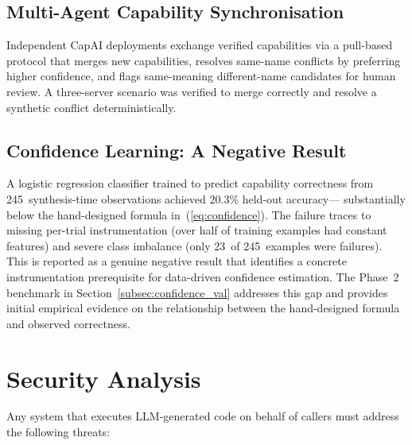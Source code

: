 \documentclass[conference]{IEEEtran}
\begin{document}
\subsection{Multi-Agent Capability Synchronisation}

Independent CapAI deployments exchange verified capabilities via a
pull-based protocol that merges new capabilities, resolves same-name
conflicts by preferring higher confidence, and flags same-meaning
different-name candidates for human review.
A three-server scenario was verified to merge correctly and resolve a
synthetic conflict deterministically.

\subsection{Confidence Learning: A Negative Result}

A logistic regression classifier trained to predict capability correctness
from 245~synthesis-time observations achieved 20.3\% held-out accuracy---
substantially below the hand-designed formula in~(\ref{eq:confidence}).
The failure traces to missing per-trial instrumentation (over half of
training examples had constant features) and severe class imbalance
(only 23~of 245~examples were failures).
This is reported as a genuine negative result that identifies a concrete
instrumentation prerequisite for data-driven confidence estimation.
The Phase~2 benchmark in Section~\ref{subsec:confidence_val} addresses
this gap and provides initial empirical evidence on the relationship
between the hand-designed formula and observed correctness.

\section{Security Analysis}
\label{sec:security}

Any system that executes LLM-generated code on behalf of callers must
address the following threats:
\end{document}
